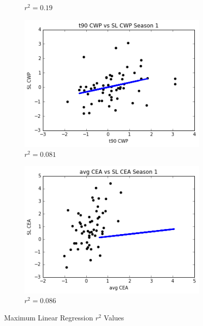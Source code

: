 \documentclass[12pt]{report}
\begin{document}
\begin{figure}[ht]
\begin{subfigure}{.5\textwidth}
\caption{$r^2 = 0.19$}
\label{fig:LinearMaxT10}
\end{subfigure}%
\begin{subfigure}{.5\textwidth}
\centering
\includegraphics[scale = .6]{graphs/T90LinearMaxS1CWP0081.png}
\caption{$r^2 = 0.081$}
\label{fig:LinearMaxT90}
\end{subfigure}
\begin{subfigure}{.5\textwidth}
\centering
\includegraphics[scale = .6]{graphs/AVGLinearMaxS1CEA0086.png}
\caption{$r^2 = 0.086$}
\label{fig:LinearMaxAVG}
\end{subfigure}
\caption{\label{fig:example}Maximum Linear Regression $r^2$ Values}
\end{figure}
\end{document}
